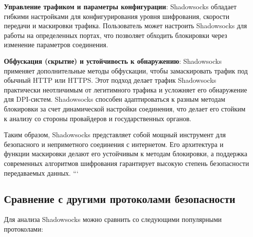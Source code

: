 \documentclass{SCWorks}
\begin{document}
\textbf{Управление трафиком и параметры конфигурации}: Shadowsocks обладает гибкими настройками для конфигурирования уровня шифрования, скорости передачи и маскировки трафика. Пользователь может настроить Shadowsocks для работы на определенных портах, что позволяет обходить блокировки через изменение параметров соединения.

\textbf{Обфускация (скрытие) и устойчивость к обнаружению}: Shadowsocks применяет дополнительные методы обфускации, чтобы замаскировать трафик под обычный HTTP или HTTPS. Этот подход делает трафик Shadowsocks практически неотличимым от легитимного трафика и усложняет его обнаружение для DPI-систем. Shadowsocks способен адаптироваться к разным методам блокировки за счет динамической настройки соединения, что делает его стойким к анализу со стороны провайдеров и государственных органов.

Таким образом, Shadowsocks представляет собой мощный инструмент для безопасного и неприметного соединения с интернетом. Его архитектура и функции маскировки делают его устойчивым к методам блокировки, а поддержка современных алгоритмов шифрования гарантирует высокую степень безопасности передаваемых данных.
```
\subsection{Сравнение с другими протоколами безопасности}

Для анализа Shadowsocks можно сравнить со следующими популярными протоколами:
\end{document}
